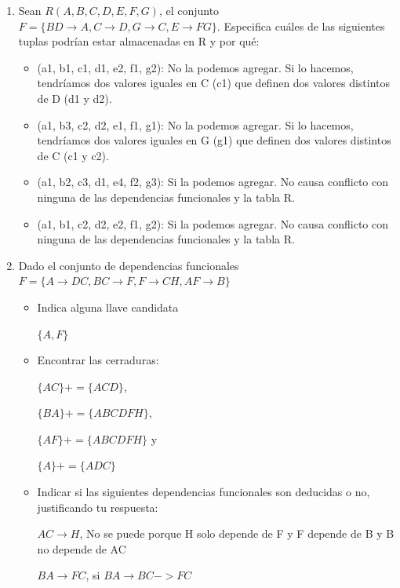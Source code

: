 \documentclass{article}
\begin{document}
\begin{enumerate}
    \item Sean $R (A, B, C, D, E, F, G)$, el conjunto $F = \{ BD \rightarrow A, C \rightarrow D, G \rightarrow C, E \rightarrow FG\}$. Especifica cuáles de las siguientes tuplas podrían estar almacenadas en R y por qué:
    \begin{itemize}
        \item (a1, b1, c1, d1, e2, f1, g2): No la podemos agregar. Si lo hacemos, tendríamos dos valores iguales en C (c1) que definen dos valores distintos de D (d1 y d2).
        \item (a1, b3, c2, d2, e1, f1, g1): No la podemos agregar. Si lo hacemos, tendríamos dos valores iguales en G (g1) que definen dos valores distintos de C (c1 y c2).
        \item (a1, b2, c3, d1, e4, f2, g3): Si la podemos agregar. No causa conflicto con ninguna de las dependencias funcionales y la tabla R.
        \item (a1, b1, c2, d2, e2, f1, g2): Si la podemos agregar. No causa conflicto con ninguna de las dependencias funcionales y la tabla R.
    \end{itemize}
    
    \item Dado el conjunto de dependencias funcionales $F = \{ A \rightarrow DC, BC \rightarrow F, F \rightarrow CH, AF \rightarrow B \} $
    \begin{itemize}
        \item Indica alguna llave candidata 
        
        $\{A,F\}$
        
        \item Encontrar las cerraduras: 
        
        $\{AC\}+ = \{ ACD\}$,
        
        $\{BA\}+ = \{ ABCDFH\}$, 
        
        $\{AF\}+ = \{ ABCDFH\}$ y 
        
        $ \{ A \}+ = \{ ADC\}$
        
        \item Indicar si las siguientes dependencias funcionales son deducidas o no, justificando tu respuesta:
        
        $ AC \rightarrow H$, No se puede porque H solo depende de F y F depende de B y B no
        depende de AC
        
        $BA \rightarrow FC$, si $BA \rightarrow BC->FC$
        

\end{itemize}
\end{enumerate}
\end{document}
